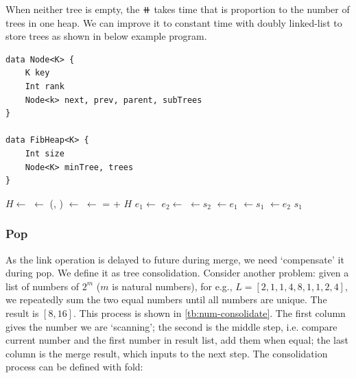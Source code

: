 \documentclass[b5paper]{article}
\begin{document}
When neither tree is empty, the $\doubleplus$ takes time that is proportion to the number of trees in one heap. We can improve it to constant time with doubly linked-list to store trees as shown in below example program.

\begin{lstlisting}[language = Bourbaki]
data Node<K> {
    K key
    Int rank
    Node<k> next, prev, parent, subTrees
}

data FibHeap<K> {
    Int size
    Node<K> minTree, trees
}
\end{lstlisting}

\begin{algorithmic}[1]
  \State $H \gets$ 
  \State {} $\gets$ (, )
    \State {} $\gets$ 
  \Else
    \State {} $\gets$ 
  \EndIf
   =  + 
  \State \Return $H$
\EndFunction
\Statex
{}
  \State $e_1 \gets$ 
  \State $e_2 \gets$ 
  \State {} $\gets s_2$
  \State {} $\gets e_1$
  \State {} $\gets s_1$
  \State {} $\gets e_2$
  \State \Return $s_1$
\EndFunction
\end{algorithmic}

\subsubsection{Pop}
 

As the link operation is delayed to future during merge, we need `compensate' it during pop. We define it as tree consolidation. Consider another problem: given a list of numbers of $2^m$ ($m$ is natural numbers), for e.g., $L = [2, 1, 1, 4, 8, 1, 1, 2, 4]$, we repeatedly sum the two equal numbers until all numbers are unique. The result is $[8, 16]$. This process is shown in \cref{tb:num-consolidate}. The first column gives the number we are `scanning'; the second is the middle step, i.e. compare current number and the first number in result list, add them when equal; the last column is the merge result, which inputs to the next step. The consolidation process can be defined with fold:
\end{document}
